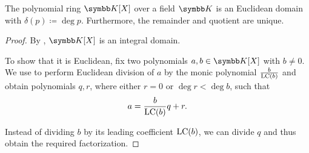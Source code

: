\begin{corollary}\label{thm:polynomials_over_field_are_euclidean_domain}\cite[10]{Knapp2016BAlg}
  The polynomial ring \( \BK[X] \) over a field \( \BK \) is an Euclidean domain with \( \delta(p) \coloneqq \deg p \). Furthermore, the remainder and quotient are unique.
\end{corollary}
\begin{proof}
  By , \( \BK[X] \) is an integral domain.

  To show that it is Euclidean, fix two polynomials \( a, b \in \BK[X] \) with \( b \neq 0 \). We use  to perform Euclidean division of \( a \) by the monic polynomial \( \frac {b} {\operatorname{LC}(b)} \) and obtain polynomials \( q, r \), where either \( r = 0 \) or \( \deg r < \deg b \), such that
  \begin{equation*}
    a = \frac {b} {\operatorname{LC}(b)} q + r.
  \end{equation*}

  Instead of dividing \( b \) by its leading coefficient \( \operatorname{LC}(b) \), we can divide \( q \) and thus obtain the required factorization.
\end{proof}

